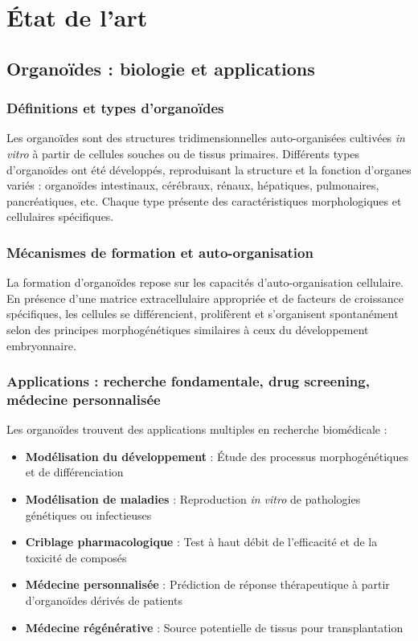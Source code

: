
\chapter{État de l'art}

\section{Organoïdes : biologie et applications}

\subsection{Définitions et types d'organoïdes}

Les organoïdes sont des structures tridimensionnelles auto-organisées cultivées \textit{in vitro} à partir de cellules souches ou de tissus primaires. Différents types d'organoïdes ont été développés, reproduisant la structure et la fonction d'organes variés : organoïdes intestinaux, cérébraux, rénaux, hépatiques, pulmonaires, pancréatiques, etc. Chaque type présente des caractéristiques morphologiques et cellulaires spécifiques.

\subsection{Mécanismes de formation et auto-organisation}

La formation d'organoïdes repose sur les capacités d'auto-organisation cellulaire. En présence d'une matrice extracellulaire appropriée et de facteurs de croissance spécifiques, les cellules se différencient, prolifèrent et s'organisent spontanément selon des principes morphogénétiques similaires à ceux du développement embryonnaire.

\subsection{Applications : recherche fondamentale, drug screening, médecine personnalisée}

Les organoïdes trouvent des applications multiples en recherche biomédicale :
\begin{itemize}
    \item \textbf{Modélisation du développement} : Étude des processus morphogénétiques et de différenciation
    \item \textbf{Modélisation de maladies} : Reproduction \textit{in vitro} de pathologies génétiques ou infectieuses
    \item \textbf{Criblage pharmacologique} : Test à haut débit de l'efficacité et de la toxicité de composés
    \item \textbf{Médecine personnalisée} : Prédiction de réponse thérapeutique à partir d'organoïdes dérivés de patients
    \item \textbf{Médecine régénérative} : Source potentielle de tissus pour transplantation
\end{itemize}

